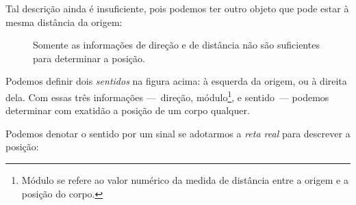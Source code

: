 Tal descrição ainda é insuficiente, pois podemos ter outro objeto que pode estar à mesma distância da origem:

\begin{figure}
\centering
{}
\caption{Somente as informações de direção e de distância não são suficientes para determinar a posição.}
\end{figure}

\noindent{}Podemos definir dois \emph{sentidos} na figura acima: à esquerda da origem, ou à direita dela. Com essas três informações ---~direção, módulo\footnote{Módulo se refere ao valor numérico da medida de distância entre a origem e a posição do corpo.}, e sentido~--- podemos determinar com exatidão a posição de um corpo qualquer.

Podemos denotar o sentido por um sinal se adotarmos a \emph{reta real} para descrever a posição:

